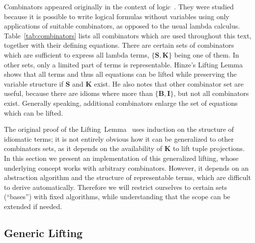 Combinators appeared originally in the context of logic~\cite{curry68}.
They were studied because it is possible to write logical formulas without
variables using only applications of suitable combinators, as opposed to the
usual lambda calculus.
Table~\ref{tab:combinators} lists all combinators which are used throughout
this text, together with their defining equations.
There are certain sets of combinators which are sufficient to express all
lambda terms, $\{\mathbf{S,K}\}$ being one of them.
In other sets, only a limited part of terms is representable.
Hinze's Lifting Lemma shows that all terms and thus all equations can be
lifted while preserving the variable structure if $\mathbf{S}$ and $\mathbf{K}$
exist.
He also notes that other combinator set are useful, because there are idioms
where more than $\{\mathbf{B,I}\}$, but not all combinators exist.
Generally speaking, additional combinators enlarge the set of equations which
can be lifted.

The original proof of the Lifting~Lemma~\cite[11--14]{hinze10} uses induction
on the structure of idiomatic terms; it is not entirely obvious how it can
be generalized to other combinators sets, as it depends on the availability
of $\mathbf{K}$ to lift tuple projections.
In this section we present an implementation of this generalized lifting,
whose underlying concept works with arbitrary combinators.
However, it depends on an abstraction algorithm and the structure of
representable terms, which are difficult to derive automatically.
Therefore we will restrict ourselves to certain sets (``bases'') with
fixed algorithms, while understanding that the scope can be extended 
if needed.

\subsection{Generic Lifting}\label{subsec:generic-lifting}

